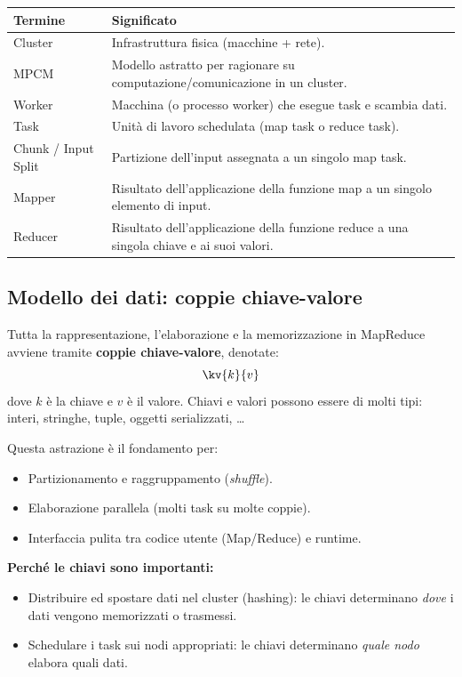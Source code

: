 \begin{tabular}{@{}lp{9cm}@{}}
  \toprule
  \textbf{Termine} & \textbf{Significato} \\
  \midrule
  Cluster & Infrastruttura fisica (macchine + rete). \\
  MPCM    & Modello astratto per ragionare su computazione/comunicazione
             in un cluster. \\
  Worker  & Macchina (o processo worker) che esegue task e scambia dati. \\
  Task    & Unità di lavoro schedulata (map task o reduce task). \\
  Chunk / Input Split & Partizione dell'input assegnata a un singolo map task. \\
  Mapper  & Risultato dell'applicazione della funzione map a un singolo
             elemento di input. \\
  Reducer & Risultato dell'applicazione della funzione reduce a una singola
             chiave e ai suoi valori. \\
  \bottomrule
\end{tabular}

\subsection{Modello dei dati: coppie chiave-valore}

\begin{definizione}
  Tutta la rappresentazione, l'elaborazione e la memorizzazione in MapReduce
  avviene tramite \textbf{coppie chiave-valore}, denotate:
  \[
    \kv{k}{v}
  \]
  dove $k$ è la chiave e $v$ è il valore. Chiavi e valori possono essere di
  molti tipi: interi, stringhe, tuple, oggetti serializzati, \ldots
\end{definizione}

Questa astrazione è il fondamento per:
\begin{itemize}
  \item Partizionamento e raggruppamento (\emph{shuffle}).
  \item Elaborazione parallela (molti task su molte coppie).
  \item Interfaccia pulita tra codice utente (Map/Reduce) e runtime.
\end{itemize}

\textbf{Perché le chiavi sono importanti:}
\begin{itemize}
  \item Distribuire ed spostare dati nel cluster (hashing): le chiavi
    determinano \emph{dove} i dati vengono memorizzati o trasmessi.
  \item Schedulare i task sui nodi appropriati: le chiavi determinano
    \emph{quale nodo} elabora quali dati.
\end{itemize}

